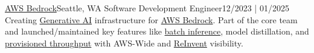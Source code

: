 \resumeSubheading
{\href{https://aws.amazon.com/bedrock/}{AWS Bedrock}}{Seattle, WA}
{Software Development Engineer}{12/2023 | 01/2025}
\resumeItemListStart
{}
{Creating \href{https://en.wikipedia.org/wiki/Generative_artificial_intelligence}{Generative AI} infrastructure for \href{https://aws.amazon.com/bedrock/}{AWS Bedrock}. Part of the core team and launched/maintained key features like \href{https://docs.aws.amazon.com/bedrock/latest/userguide/batch-inference.html}{batch inference}, model distillation, and \href{https://docs.aws.amazon.com/bedrock/latest/userguide/prov-throughput.html}{provisioned throughput} with AWS-Wide and \href{https://reinvent.awsevents.com/}{ReInvent} visibility.}
\resumeItemListEnd
